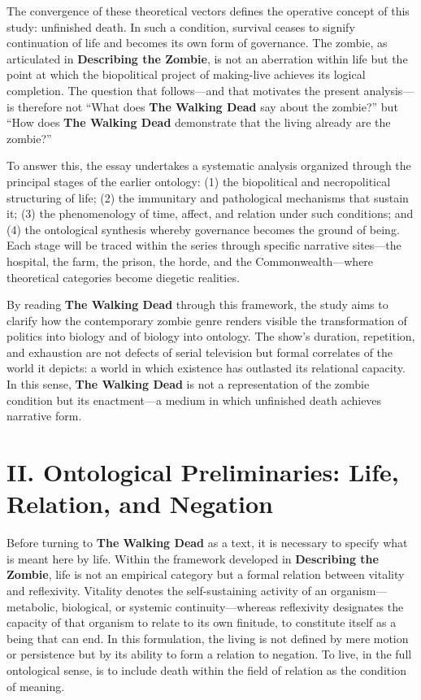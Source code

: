 \documentclass[11pt]{article}
\begin{document}
The convergence of these theoretical vectors defines the operative concept of this study: unfinished death.  In such a condition, survival ceases to signify continuation of life and becomes its own form of governance.  The zombie, as articulated in \textbf{Describing the Zombie}, is not an aberration within life but the point at which the biopolitical project of making-live achieves its logical completion.  The question that follows—and that motivates the present analysis—is therefore not “What does \textbf{The Walking Dead} say about the zombie?” but “How does \textbf{The Walking Dead} demonstrate that the living already are the zombie?”  

To answer this, the essay undertakes a systematic analysis organized through the principal stages of the earlier ontology: (1) the biopolitical and necropolitical structuring of life; (2) the immunitary and pathological mechanisms that sustain it; (3) the phenomenology of time, affect, and relation under such conditions; and (4) the ontological synthesis whereby governance becomes the ground of being.  Each stage will be traced within the series through specific narrative sites—the hospital, the farm, the prison, the horde, and the Commonwealth—where theoretical categories become diegetic realities.  

By reading \textbf{The Walking Dead} through this framework, the study aims to clarify how the contemporary zombie genre renders visible the transformation of politics into biology and of biology into ontology.  The show’s duration, repetition, and exhaustion are not defects of serial television but formal correlates of the world it depicts: a world in which existence has outlasted its relational capacity.  In this sense, \textbf{The Walking Dead} is not a representation of the zombie condition but its enactment—a medium in which unfinished death achieves narrative form.  
\section*{II. Ontological Preliminaries: Life, Relation, and Negation}
\label{sec:orgb9bd551}

Before turning to \textbf{The Walking Dead} as a text, it is necessary to specify what is meant here by life.  Within the framework developed in \textbf{Describing the Zombie}, life is not an empirical category but a formal relation between vitality and reflexivity.  Vitality denotes the self-sustaining activity of an organism—metabolic, biological, or systemic continuity—whereas reflexivity designates the capacity of that organism to relate to its own finitude, to constitute itself as a being that can end.  In this formulation, the living is not defined by mere motion or persistence but by its ability to form a relation to negation.  To live, in the full ontological sense, is to include death within the field of relation as the condition of meaning.  
\end{document}

